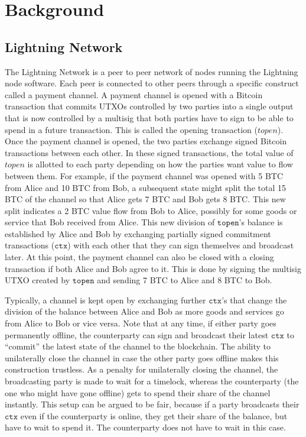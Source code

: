 \section{Background}
\subsection{Lightning Network}
The Lightning Network is a peer to peer network of nodes running the Lightning node software. Each peer is connected to other peers through a specific construct called a payment channel. A payment channel is opened with a Bitcoin transaction that commits UTXOs controlled by two parties into a single output that is now controlled by a multisig that both parties have to sign to be able to spend in a future transaction. This is called the opening transaction ($topen$). Once the payment channel is opened, the two parties exchange signed Bitcoin transactions between each other. In these signed transactions, the total value of $topen$ is allotted to each party depending on how the parties want value to flow between them. For example, if the payment channel was opened with 5 BTC from Alice and 10 BTC from Bob, a subsequent state might split the total 15 BTC of the channel so that Alice gets 7 BTC and Bob gets 8 BTC. This new split indicates a 2 BTC value flow from Bob to Alice, possibly for some goods or service that Bob received from Alice. This new division of $\texttt{topen}$'s balance is established by Alice and Bob by exchanging partially signed commitment transactions ($\texttt{ctx}$) with each other that they can sign themselves and broadcast later. At this point, the payment channel can also be closed with a closing transaction if both Alice and Bob agree to it. This is done by signing the multisig UTXO created by $\texttt{topen}$ and sending 7 BTC to Alice and 8 BTC to Bob. 

Typically, a channel is kept open by exchanging further $\texttt{ctx}$'s that change the division of the balance between Alice and Bob as more goods and services go from Alice to Bob or vice versa. Note that at any time, if either party goes permanently offline, the counterparty can sign and broadcast their latest $\texttt{ctx}$ to ``commit'' the latest state of the channel to the blockchain. The ability to unilaterally close the channel in case the other party goes offline makes this construction trustless. As a penalty for unilaterally closing the channel, the broadcasting party is made to wait for a timelock, whereas the counterparty (the one who might have gone offline) gets to spend their share of the channel instantly. This setup can be argued to be fair, because if a party broadcasts their $\texttt{ctx}$ even if the counterparty is online, they get their share of the balance, but have to wait to spend it. The counterparty does not have to wait in this case.

